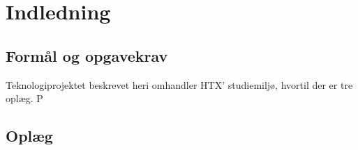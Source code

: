 \section{Indledning}
    \subsection{Formål og opgavekrav}
        Teknologiprojektet beskrevet heri omhandler HTX' studiemiljø, hvortil der er tre oplæg. P   
    \subsection{Oplæg}